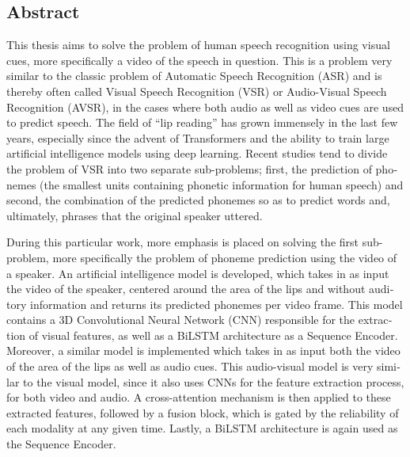 \begin{english}
\vspace*{\fill} %
\section*{Abstract}
\label{AbstractEnglish}

This thesis aims to solve the problem of human speech recognition using visual cues, more specifically a video of the speech in question. This is a problem very similar to the classic problem of Automatic Speech Recognition (ASR) and is thereby often called Visual Speech Recognition (VSR) or Audio-Visual Speech Recognition (AVSR), in the cases where both audio as well as video cues are used to predict speech. The field of ``lip reading'' has grown immensely in the last few years, especially since the advent of Transformers and the ability to train large artificial intelligence models using deep learning. Recent studies tend to divide the problem of VSR into two separate sub-problems; first, the prediction of phonemes (the smallest units containing phonetic information for human speech) and second, the combination of the predicted phonemes so as to predict words and, ultimately, phrases that the original speaker uttered.

During this particular work, more emphasis is placed on solving the first sub-problem, more specifically the problem of phoneme prediction using the video of a speaker. An artificial intelligence model is developed, which takes in as input the video of the speaker, centered around the area of the lips and without auditory information and returns its predicted phonemes per video frame. This model contains a 3D Convolutional Neural Network (CNN) responsible for the extraction of visual features, as well as a BiLSTM architecture as a Sequence Encoder. Moreover, a similar model is implemented which takes in as input both the video of the area of the lips as well as audio cues. This audio-visual model is very similar to the visual model, since it also uses CNNs for the feature extraction process, for both video and audio. A cross-attention mechanism is then applied to these extracted features, followed by a fusion block, which is gated by the reliability of each modality at any given time. Lastly, a BiLSTM architecture is again used as the Sequence Encoder.


\end{english}
